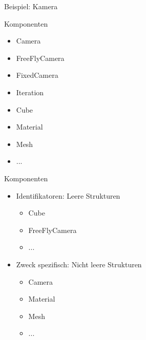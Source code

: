 \documentclass{presentation}
\begin{document}
\begin{frame}{Beispiel: Kamera}
    \begin{center}
        
    \end{center}
\end{frame}

\begin{frame}{Komponenten}
    \begin{itemize}
        \item Camera
        \item FreeFlyCamera
        \item FixedCamera
        \item Iteration
        \item Cube
        \item Material
        \item Mesh
        \item ...
    \end{itemize}
\end{frame}

\begin{frame}{Komponenten}
    \begin{itemize}
        \item Identifikatoren: Leere Strukturen
        \begin{itemize}
            \item Cube
            \item FreeFlyCamera
            \item ...
        \end{itemize}
        \item Zweck spezifisch: Nicht leere Strukturen
        \begin{itemize}
            \item Camera
            \item Material
            \item Mesh
            \item ...
        \end{itemize}
    \end{itemize}
\end{frame}
\end{document}
